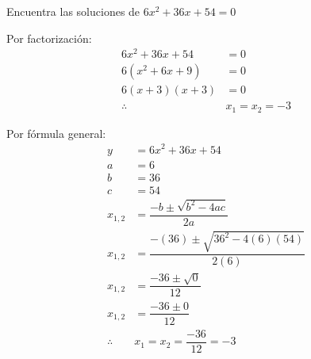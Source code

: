 Encuentra las soluciones de $6x^2+36x+54=0$

\begin{solutionbox}{12cm}
    \begin{multicols}{2}
        Por factorización:
        \begin{align*}
            6x^2+36x+54 & = 0          \\
            6(x^2+6x+9) & = 0          \\
            6(x+3)(x+3) & = 0          \\
            \therefore  & x_1 = x_2=-3
        \end{align*}

        \columnbreak

        Por fórmula general:
        \begin{align*}
            y          & =	    6x^2+36x+54
            \\
            a          & =6
            \\
            b          & =36
            \\
            c          & =54
            \\
            x_{1,2}    & = \dfrac{-b\pm\sqrt{b^2-4ac}}{2a}
            \\[2em]
            x_{1,2}    & = \dfrac{-(36)\pm\sqrt{36^2-4(6)(54)}}{2(6)}
            \\[2em]
            x_{1,2}    & = \dfrac{-36\pm\sqrt{0}}{12}
            \\[2em]
            x_{1,2}    & = \dfrac{-36\pm 0}{12}
            \\[2em]
            \therefore & x_1 =x_2=\dfrac{-36}{12}=-3                  \\[2em]
        \end{align*}
    \end{multicols}
\end{solutionbox}
